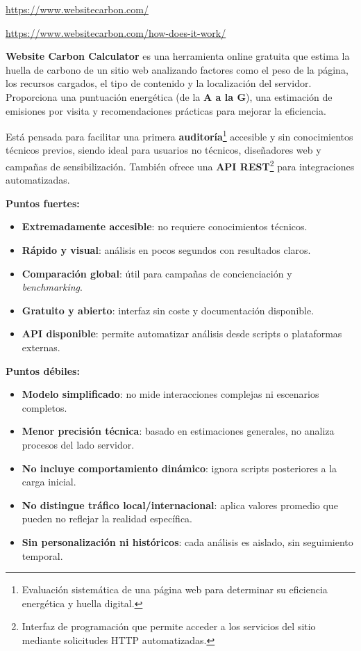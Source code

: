 \documentclass[12pt,a4paper]{report}
\begin{document}
\url{https://www.websitecarbon.com/}

\url{https://www.websitecarbon.com/how-does-it-work/}

\textbf{Website Carbon Calculator} es una herramienta online gratuita que estima la huella de carbono de un sitio web analizando factores como el peso de la página, los recursos cargados, el tipo de contenido y la localización del servidor. Proporciona una puntuación energética (de la \textbf{A a la G}), una estimación de emisiones por visita y recomendaciones prácticas para mejorar la eficiencia.

Está pensada para facilitar una primera \textbf{auditoría}\footnote{Evaluación
  sistemática de una página web para determinar su eficiencia energética y huella
  digital.} accesible y sin conocimientos técnicos previos, siendo ideal para
usuarios no técnicos, diseñadores web y campañas de sensibilización. También
ofrece una \textbf{API REST}\footnote{Interfaz de programación que permite
  acceder a los servicios del sitio mediante solicitudes HTTP automatizadas.}
para integraciones automatizadas.

\textbf{Puntos fuertes:}
\begin{itemize}
  \item \textbf{Extremadamente accesible}: no requiere conocimientos técnicos.
  \item \textbf{Rápido y visual}: análisis en pocos segundos con resultados claros.
  \item \textbf{Comparación global}: útil para campañas de concienciación y \textit{benchmarking}.
  \item \textbf{Gratuito y abierto}: interfaz sin coste y documentación disponible.
  \item \textbf{API disponible}: permite automatizar análisis desde scripts o plataformas externas.
\end{itemize}

\textbf{Puntos débiles:}
\begin{itemize}
  \item \textbf{Modelo simplificado}: no mide interacciones complejas ni escenarios completos.
  \item \textbf{Menor precisión técnica}: basado en estimaciones generales, no analiza procesos del lado servidor.
  \item \textbf{No incluye comportamiento dinámico}: ignora scripts posteriores a la carga inicial.
  \item \textbf{No distingue tráfico local/internacional}: aplica valores promedio que pueden no reflejar la realidad específica.
  \item \textbf{Sin personalización ni históricos}: cada análisis es aislado, sin seguimiento temporal.
\end{itemize}
\end{document}
